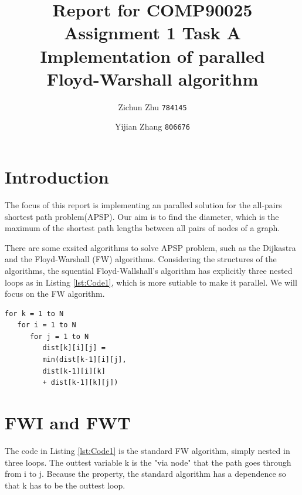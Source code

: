 \documentclass[11pt]{article}
\title{Report for COMP90025 Assignment 1 Task A \\
  \large Implementation of paralled \\
  Floyd-Warshall algorithm}
\author{Zichun Zhu \texttt{784145} \and Yijian Zhang \texttt{806676}}
\begin{document}
\maketitle

\section{Introduction}
The focus of this report is implementing an paralled solution for the all-pairs shortest path problem(APSP). Our aim is to find the diameter, which is the maximum of the shortest path lengths between all pairs of nodes of a graph. 

There are some exsited algorithms to solve APSP problem, such as the Dijkastra and the Floyd-Warshall (FW) algorithms\cite{albalawi2013task}. Considering the structures of the algorithms, the squential Floyd-Wallshall's algorithm has explicitly three nested loops as in Listing \ref{lst:Code1}, which is more sutiable to make it parallel. We will focus on the FW algorithm.

\begin{lstlisting}[label={lst:Code1},caption={Sequantial standard FW algorithm.}, captionpos=b,basicstyle=\small]
for k = 1 to N
   for i = 1 to N
      for j = 1 to N
         dist[k][i][j] = 
         min(dist[k-1][i][j], 
         dist[k-1][i][k]
         + dist[k-1][k][j])
\end{lstlisting}

\section{FWI and FWT}
The code in Listing \ref{lst:Code1} is the standard FW algorithm, simply nested in three loops. The outtest variable k is the "via node" that the path goes through from i to j. Because the property, the standard algorithm has a dependence so that k has to be the outtest loop.
\end{document}
